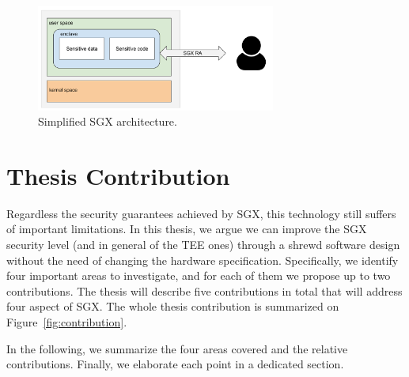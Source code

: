 \begin{figure}[t]
	\centering
	\includegraphics[width=0.7\textwidth]{fig_c1/sgx-architecture.pdf}
	\caption[SGX architecture.]{Simplified SGX architecture.}
	\label{fig:sgx-architecture}
\end{figure}

\section{Thesis Contribution}

Regardless the security guarantees achieved by SGX, this technology still 
suffers of important limitations.
In this thesis, we argue we can improve the SGX security level (and in 
general of the TEE ones) through a shrewd software design without the need of 
changing the hardware specification.
Specifically, we identify four important areas to investigate, and for each of 
them we propose up to two contributions.
The thesis will describe five contributions in total that will 
address four aspect of SGX. The whole thesis contribution is summarized on 
Figure~\ref{fig:contribution}.

In the following, we summarize the four areas covered and the relative 
contributions. Finally, we elaborate each point in a dedicated section.


